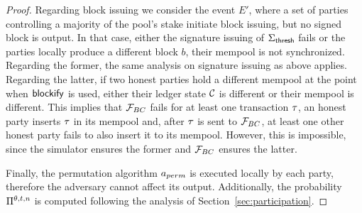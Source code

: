 \begin{proof}
    Regarding block issuing we consider the event $E'$, where a set of parties
    controlling a majority of the pool's stake initiate block issuing, but no
    signed block is output. In that case, either the signature issuing of
    $\Sigma_{\mathsf{thresh}}$ fails or the parties locally produce a different block
    $b$, \ie their mempool is not synchronized. Regarding the former, the
    same analysis on signature issuing as above applies. Regarding the latter,
    if two honest parties hold a different mempool at the point when
    $\mathsf{blockify}$ is used, either their ledger state $\mathcal{C}$ is different or
    their mempool is different. This implies that ${\mathcal{F}}_{BC}$ fails for at least
    one transaction $\tau$, \ie an honest party inserts $\tau$ in its mempool
    and, after $\tau$ is sent to ${\mathcal{F}}_{BC}$, at least one other honest party
    fails to also insert it to its mempool. However, this is impossible, since
    the simulator ensures the former and ${\mathcal{F}}_{BC}$ ensures the latter.

    Finally, the permutation algorithm $a_{perm}$ is executed locally
    by each party, therefore the adversary cannot affect its output.
    Additionally, the probability $\Pi^{\theta,
    t, n}$ is computed following the analysis of
    Section~\ref{sec:participation}.
\end{proof}
